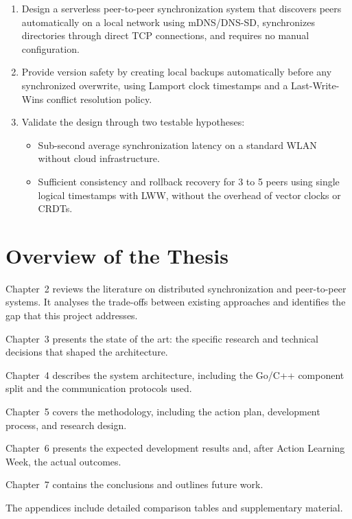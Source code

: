 \begin{enumerate}
    \item Design a serverless peer-to-peer synchronization system that discovers peers automatically on a local network using mDNS/DNS-SD, synchronizes directories through direct TCP connections, and requires no manual configuration.

    \item Provide version safety by creating local backups automatically before any synchronized overwrite, using Lamport clock timestamps and a Last-Write-Wins conflict resolution policy.

    \item Validate the design through two testable hypotheses:
    \begin{itemize}
        \item[$H_1$:] Sub-second average synchronization latency on a standard WLAN without cloud infrastructure.
        \item[$H_2$:] Sufficient consistency and rollback recovery for 3 to 5 peers using single logical timestamps with LWW, without the overhead of vector clocks or CRDTs.
    \end{itemize}
\end{enumerate}

\section{Overview of the Thesis}

Chapter~2 reviews the literature on distributed synchronization and peer-to-peer systems. It analyses the trade-offs between existing approaches and identifies the gap that this project addresses.

Chapter~3 presents the state of the art: the specific research and technical decisions that shaped the architecture.

Chapter~4 describes the system architecture, including the Go/C++ component split and the communication protocols used.

Chapter~5 covers the methodology, including the action plan, development process, and research design.

Chapter~6 presents the expected development results and, after Action Learning Week, the actual outcomes.

Chapter~7 contains the conclusions and outlines future work.

The appendices include detailed comparison tables and supplementary material.
